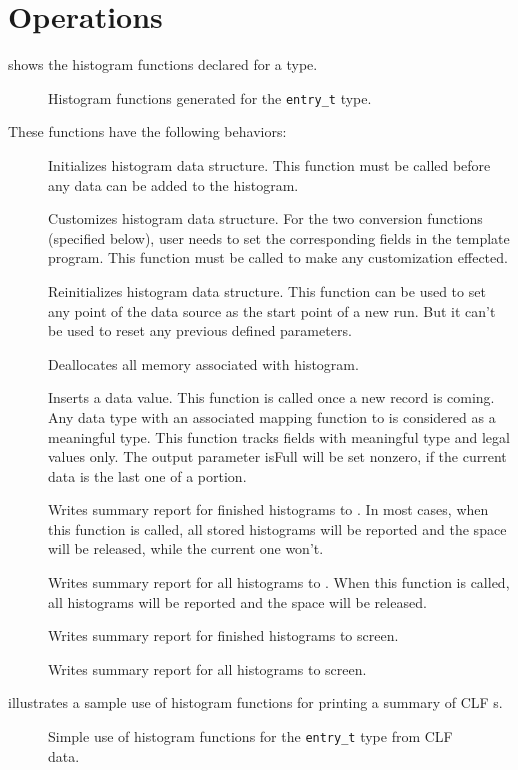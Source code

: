 \section{Operations}
 shows the histogram functions declared 
for a \pads{} type.
\begin{figure}
\caption{Histogram functions generated for the \texttt{entry\_t} type.}
\label{figure:histogram}
\end{figure}
%
These functions have the following behaviors:
\begin{description}
\item[] Initializes histogram data
  structure. This function must be called before any data can be added
  to the histogram.
\item[] Customizes histogram data
  structure. For the two conversion functions (specified below), user
  needs to set the corresponding fields in the template program. This
  function must be called to make any customization effected.  
\item[] Reinitializes histogram data
  structure. This function can be used to set any point of the data
  source as the start point of a new run. But it can't be used to 
  reset any previous defined parameters.
\item[] Deallocates all memory associated
  with histogram.
\item[] Inserts a data value. This function 
  is called once a new record is coming. Any data type with an
  associated mapping function to  is considered as a 
  meaningful type. This function tracks fields with meaningful type
  and legal values only. The output parameter isFull will be set 
  nonzero, if the current data is the last one of a portion.
\item[] Writes summary report for
  finished histograms to . In most cases, when this
  function is called, all stored histograms will be reported and the
  space will be released, while the current one won't.
\item[] Writes summary report for
  all histograms to . When this function is called, all 
  histograms will be reported and the space will be released. 
\item[] Writes summary report for
  finished histograms to screen.
\item[] Writes summary report for
  all histograms to screen. 
\end{description}
 illustrates a sample use of histogram
functions for printing a summary of CLF s.  
\begin{figure}
\caption{Simple use of histogram functions for the
  \texttt{entry\_t} type from CLF data.}
\label{figure:wsl-hist-hand}
\end{figure}


